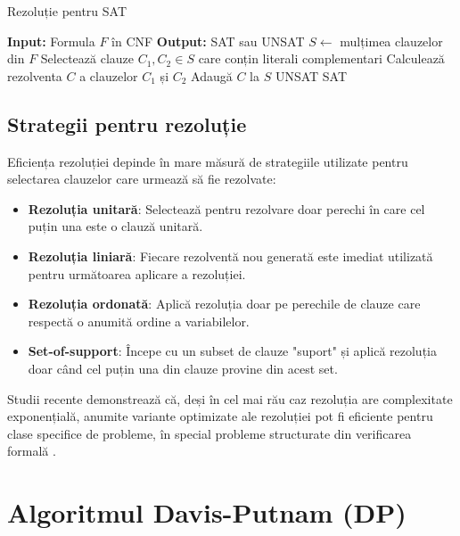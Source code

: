 \documentclass[a4paper,10pt]{article}
\begin{document}
\begin{algorithm}
\caption{Rezoluție pentru SAT}
\begin{algorithmic}[1]
\State \textbf{Input:} Formula $F$ în CNF
\State \textbf{Output:} SAT sau UNSAT
\State $S \gets$ mulțimea clauzelor din $F$
    \State Selectează clauze $C_1, C_2 \in S$ care conțin literali complementari
    \State Calculează rezolventa $C$ a clauzelor $C_1$ și $C_2$
        \State Adaugă $C$ la $S$
    \EndIf
\EndWhile
{}
    \Return UNSAT
\Else
    \Return SAT
\EndIf
\end{algorithmic}
\end{algorithm}

\subsection{Strategii pentru rezoluție}

Eficiența rezoluției depinde în mare măsură de strategiile utilizate pentru selectarea clauzelor care urmează să fie rezolvate:

\begin{itemize}
    \item \textbf{Rezoluția unitară}: Selectează pentru rezolvare doar perechi în care cel puțin una este o clauză unitară.
    \item \textbf{Rezoluția liniară}: Fiecare rezolventă nou generată este imediat utilizată pentru următoarea aplicare a rezoluției.
    \item \textbf{Rezoluția ordonată}: Aplică rezoluția doar pe perechile de clauze care respectă o anumită ordine a variabilelor.
    \item \textbf{Set-of-support}: Începe cu un subset de clauze "suport" și aplică rezoluția doar când cel puțin una din clauze provine din acest set.
\end{itemize}

Studii recente demonstrează că, deși în cel mai rău caz rezoluția are complexitate exponențială, anumite variante optimizate ale rezoluției pot fi eficiente pentru clase specifice de probleme, în special probleme structurate din verificarea formală \cite{Zhang2020}.

\section{Algoritmul Davis-Putnam (DP)}
\end{document}
